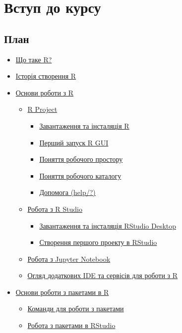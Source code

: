 \documentclass[
]{book}
\providecommand{\tightlist}{%
  \setlength{\itemsep}{0pt}\setlength{\parskip}{0pt}}
\begin{document}
\hypertarget{chapter1}{%
\chapter{Вступ до курсу}\label{chapter1}}

\hypertarget{ux43fux43bux430ux43d}{%
\section*{План}\label{ux43fux43bux430ux43d}}

\begin{itemize}
\tightlist
\item
  \protect\hyperlink{chapter11}{Що таке R?}
\item
  \protect\hyperlink{chapter12}{Історія створення R}
\item
  \protect\hyperlink{chapter13}{Основи роботи з R}

  \begin{itemize}
  \tightlist
  \item
    \protect\hyperlink{chapter131}{R Project}

    \begin{itemize}
    \tightlist
    \item
      \protect\hyperlink{chapter1311}{Завантаження та інсталяція R}
    \item
      \protect\hyperlink{chapter1312}{Перший запуск R GUI}
    \item
      \protect\hyperlink{chapter1313}{Поняття робочого простору}
    \item
      \protect\hyperlink{chapter1314}{Поняття робочого каталогу}
    \item
      \protect\hyperlink{chapter1315}{Допомога (help/?)}
    \end{itemize}
  \item
    \protect\hyperlink{chapter132}{Робота з R Studio}

    \begin{itemize}
    \tightlist
    \item
      \protect\hyperlink{chapter1321}{Завантаження та інсталяція RStudio Desktop}
    \item
      \protect\hyperlink{chapter1322}{Створення першого проекту в RStudio}
    \end{itemize}
  \item
    \protect\hyperlink{chapter133}{Робота з Jupyter Notebook}
  \item
    \protect\hyperlink{chapter134}{Огляд додаткових IDE та сервісів для роботи з R}
  \end{itemize}
\item
  \protect\hyperlink{chapter14}{Основи роботи з пакетами в R}

  \begin{itemize}
  \tightlist
  \item
    \protect\hyperlink{chapter141}{Команди для роботи з пакетами}
  \item
    \protect\hyperlink{chapter142}{Робота з пакетами в RStudio}
  \end{itemize}
\end{itemize}
\end{document}
